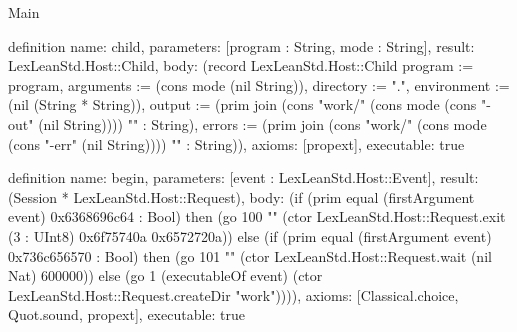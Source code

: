 \begin{lexlean}{Main}
\begin{semanticmodule}
definition{
  name: child,
  parameters: [program : String, mode : String],
  result: LexLeanStd.Host::Child,
  body: (record LexLeanStd.Host::Child {program := program, arguments := (cons mode (nil String)), directory := ".", environment := (nil (String * String)), output := (prim join (cons "work/" (cons mode (cons "-out" (nil String)))) "" : String), errors := (prim join (cons "work/" (cons mode (cons "-err" (nil String)))) "" : String)}),
  axioms: [propext],
  executable: true
}

definition{
  name: begin,
  parameters: [event : LexLeanStd.Host::Event],
  result: (Session * LexLeanStd.Host::Request),
  body: (if (prim equal (firstArgument event) 0x6368696c64 : Bool) then (go 100 "" (ctor LexLeanStd.Host::Request.exit (3 : UInt8) 0x6f75740a 0x6572720a)) else (if (prim equal (firstArgument event) 0x736c656570 : Bool) then (go 101 "" (ctor LexLeanStd.Host::Request.wait (nil Nat) 600000)) else (go 1 (executableOf event) (ctor LexLeanStd.Host::Request.createDir "work")))),
  axioms: [Classical.choice, Quot.sound, propext],
  executable: true
}


\end{semanticmodule}
\end{lexlean}
